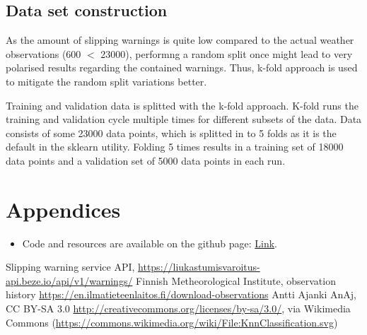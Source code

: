 \documentclass[12pt, a4paper]{report}
\begin{document}
    \subsection{Data set construction}
    As the amount of slipping warnings is quite low compared to the actual weather observations (600 $<$ 23000), performng a random split once might lead to 
    very polarised results regarding the contained warnings. Thus, k-fold approach is used to mitigate the random split variations better.

    Training and validation data is splitted with the k-fold approach. K-fold runs the training and validation cycle multiple times for different
    subsets of the data. Data consists of some 23000 data points, which is splitted in to 5 folds as it is the default in the sklearn utility. 
    Folding 5 times results in a training set of 18000 data points and a validation set of 5000 data points in each run.
    

    \section{Appendices}
    \begin{itemize}
      \item Code and resources are available on the github page: \href{}{Link}.
    \end{itemize}

    \newpage

    \begin{thebibliography}{9}
      Slipping warning service API, \href{https://liukastumisvaroitus-api.beze.io/api/v1/warnings/}{https://liukastumisvaroitus-api.beze.io/api/v1/warnings/}
      Finnish Metheorological Institute, observation history \href{https://en.ilmatieteenlaitos.fi/download-observations}{https://en.ilmatieteenlaitos.fi/download-observations}
      Antti Ajanki AnAj, CC BY-SA 3.0 \href{http://creativecommons.org/licenses/by-sa/3.0/}{http://creativecommons.org/licenses/by-sa/3.0/}, via Wikimedia Commons (\href{https://commons.wikimedia.org/wiki/File:KnnClassification.svg}{https://commons.wikimedia.org/wiki/File:KnnClassification.svg})
    \end{thebibliography}
\end{document}
